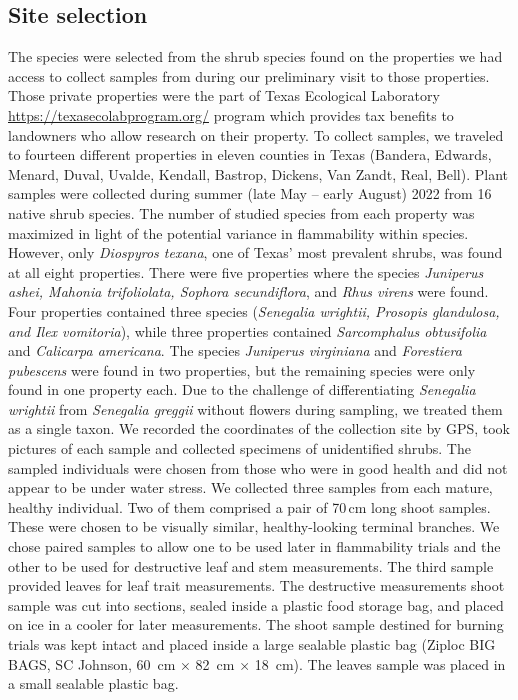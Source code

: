 \documentclass{bmcart}
\begin{document}
\subsection*{Site selection}
The species were selected from the shrub species found on the properties we had access to collect samples from during our preliminary visit to those properties. Those private properties were the part of Texas Ecological Laboratory  \url{https://texasecolabprogram.org/} program which provides tax benefits to landowners who allow research on their property.  To collect samples, we traveled to fourteen different properties in eleven counties in Texas (Bandera, Edwards, Menard, Duval, Uvalde, Kendall, Bastrop, Dickens, Van Zandt, Real, Bell).   
Plant samples were collected during summer (late May -- early August) 2022 from 16 native shrub species. The number of studied species from each property was maximized in light of the potential variance in flammability within species. However, only \emph{Diospyros texana}, one of Texas' most prevalent shrubs, was found at all eight properties. There were five properties where the species \emph{Juniperus ashei, Mahonia trifoliolata, Sophora secundiflora}, and \emph{Rhus virens} were found. Four properties contained three species (\emph{Senegalia wrightii, Prosopis glandulosa, and Ilex vomitoria}), while three properties contained \emph{Sarcomphalus obtusifolia} \citep{hauenschild2016phylogenetic} and \emph{Calicarpa americana}. The species \emph{Juniperus virginiana} and \emph{Forestiera pubescens} were found in two properties, but the remaining species were only found in one property each. Due to the challenge of differentiating \emph{Senegalia wrightii} from \emph{Senegalia greggii} without flowers during sampling, we treated them as a single taxon. We recorded the coordinates of the collection site by GPS, took pictures of each sample  and collected specimens of unidentified shrubs.
The sampled individuals were chosen from those who were in good health and did not appear to be under water stress. We collected three samples from each mature, healthy individual. Two of them comprised a pair of 70\,cm long shoot samples. These were chosen to be visually similar, healthy-looking terminal branches. We chose paired samples to allow one to be used later in flammability trials and the other to be used for destructive leaf and stem measurements. The third sample provided leaves for leaf trait measurements. The destructive measurements shoot sample was cut into sections, sealed inside a plastic food storage bag, and placed on ice in a cooler for later measurements. The shoot sample destined for burning trials was kept intact and placed inside a large sealable plastic bag (Ziploc BIG BAGS, SC Johnson, 60 \,cm × 82 \,cm × 18 \,cm). The leaves sample was placed in a small sealable plastic bag.
\end{document}
